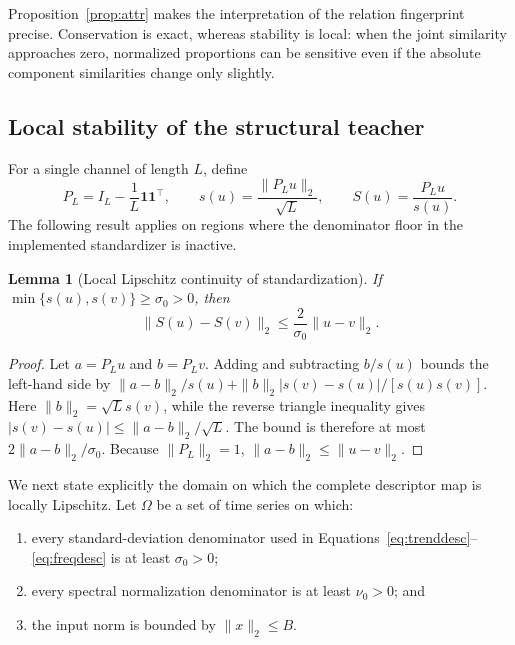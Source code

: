 \documentclass[pdflatex,sn-mathphys-num]{sn-jnl}
\newcommand{\1}{\mathbf{1}}
\theoremstyle{plain}
\newtheorem{lemma}{Lemma}
\begin{document}
	Proposition~\ref{prop:attr} makes the interpretation of the relation
	fingerprint precise. Conservation is exact, whereas stability is local:
	when the joint similarity approaches zero, normalized proportions can
	be sensitive even if the absolute component similarities change only
	slightly.
	
	\subsection{Local stability of the structural teacher}
	
	For a single channel of length $L$, define
	\begin{equation}
		P_L
		=
		I_L-\frac{1}{L}\mathbf{1}\mathbf{1}^{\top},
		\qquad
		s(u)
		=
		\frac{\|P_Lu\|_2}{\sqrt{L}},
		\qquad
		S(u)
		=
		\frac{P_Lu}{s(u)}.
		\label{eq:standardization_map}
	\end{equation}
	The following result applies on regions where the denominator floor in
	the implemented standardizer is inactive.
	
	\begin{lemma}[Local Lipschitz continuity of standardization]
		\label{lem:std}
		If $\min\{s(u),s(v)\}\geq\sigma_0>0$, then
		\begin{equation}
			\|S(u)-S(v)\|_2
			\leq
			\frac{2}{\sigma_0}\|u-v\|_2.
			\label{eq:std_lipschitz}
		\end{equation}
	\end{lemma}
	
	\begin{proof}
		Let $a=P_Lu$ and $b=P_Lv$. Adding and subtracting $b/s(u)$ bounds the left-hand side by $\|a-b\|_2/s(u)+\|b\|_2|s(v)-s(u)|/[s(u)s(v)]$. Here $\|b\|_2=\sqrt{L}s(v)$, while the reverse triangle inequality gives $|s(v)-s(u)|\leq\|a-b\|_2/\sqrt{L}$. The bound is therefore at most $2\|a-b\|_2/\sigma_0$. Because $\|P_L\|_2=1$, $\|a-b\|_2\leq\|u-v\|_2$.
	\end{proof}
	
	We next state explicitly the domain on which the complete descriptor
	map is locally Lipschitz. Let $\Omega$ be a set of time series on which:
	
	\begin{enumerate}
		\item every standard-deviation denominator used in
		Equations~\eqref{eq:trenddesc}--\eqref{eq:freqdesc} is at least
		$\sigma_0>0$;
		\item every spectral normalization denominator is at least
		$\nu_0>0$; and
		\item the input norm is bounded by $\|x\|_2\leq B$.
	\end{enumerate}
	
\end{document}
